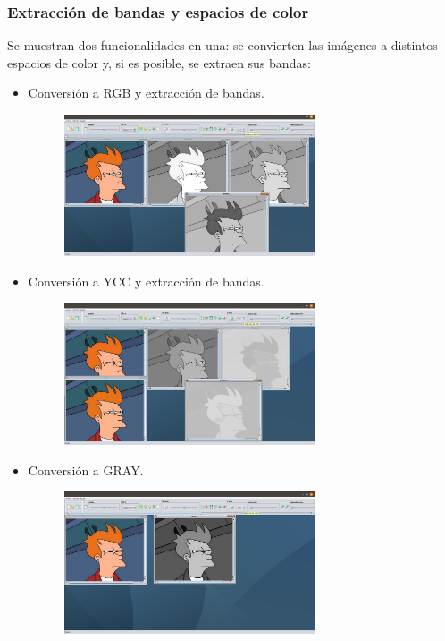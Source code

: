 \documentclass[11pt,a4paper]{article}
\begin{document}
\subsubsection{Extracción de bandas y espacios de color}
Se muestran dos funcionalidades en una: se convierten las imágenes a distintos espacios de color y, si es posible, se extraen sus bandas:
	\begin{itemize}
		\item Conversión a RGB y extracción de bandas.
			\begin{figure}[H]
			\centering
				\includegraphics[width=0.7\textwidth]{img/bandasrgb.png}
			\end{figure}
		\item Conversión a YCC y extracción de bandas.
			\begin{figure}[H]
			\centering
				\includegraphics[width=0.7\textwidth]{img/bandasycc.png}
			\end{figure}
		\item Conversión a GRAY.
			\begin{figure}[H]
			\centering
				\includegraphics[width=0.7\textwidth]{img/gray.png}
			\end{figure}
	\end{itemize}
	
\end{document}
